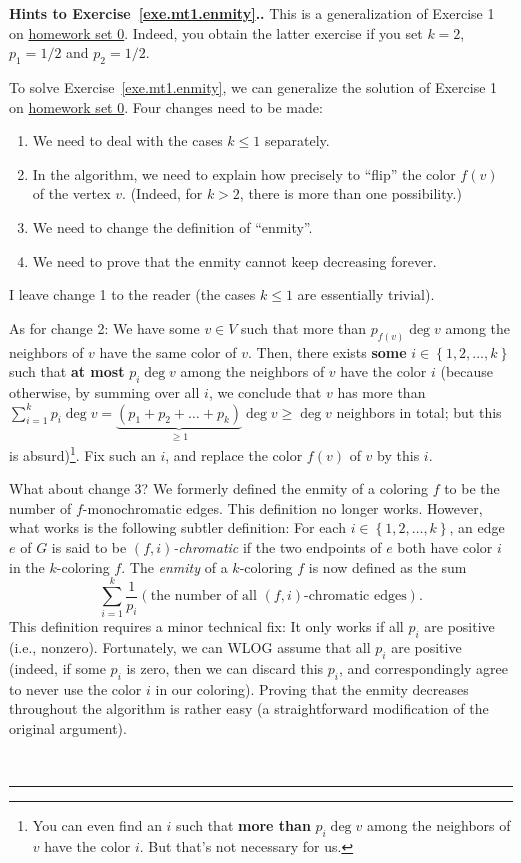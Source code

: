 \documentclass[numbers=enddot,12pt,final,onecolumn,notitlepage]{scrartcl}%
\newcounter{exer}
\theoremstyle{definition}
\newenvironment{proof}[1][Proof]{\noindent\textbf{#1.} }{\ \rule{0.5em}{0.5em}}
\let\sumnonlimits\sum
\renewcommand{\sum}{\sumnonlimits\limits}
\newcommand{\set}[1]{\left\{ #1 \right\}}
\newcommand{\tup}[1]{\left( #1 \right)}
\begin{document}
\begin{proof}[Hints to Exercise~\ref{exe.mt1.enmity}.]
This is a generalization of Exercise 1 on
\href{http://www-users.math.umn.edu/~dgrinber/5707s17/hw0s.pdf}{homework set 0}.
Indeed, you obtain the latter exercise if you set $k = 2$, $p_1 = 1/2$
and $p_2 = 1/2$.

To solve Exercise~\ref{exe.mt1.enmity}, we can generalize the solution
of Exercise 1 on
\href{http://www-users.math.umn.edu/~dgrinber/5707s17/hw0s.pdf}{homework set 0}.
Four changes need to be made:

\begin{enumerate}
\item We need to deal with the cases $k \leq 1$ separately.
\item In the algorithm, we need to explain how precisely to ``flip''
      the color $f\tup{v}$ of the vertex $v$. (Indeed, for $k > 2$,
      there is more than one possibility.)
\item We need to change the definition of ``enmity''.
\item We need to prove that the enmity cannot keep decreasing forever.
\end{enumerate}

I leave change 1 to the reader (the cases $k \leq 1$ are essentially
trivial).

As for change 2: We have some $v \in V$ such that more than
$p_{f\tup{v}} \deg v$ among the neighbors of $v$ have the same color
of $v$. Then, there exists \textbf{some} $i \in \set{1, 2, \ldots, k}$
such that \textbf{at most} $p_i \deg v$ among the neighbors of $v$
have the color $i$ (because otherwise, by summing over all $i$, we
conclude that $v$ has more than
$\sum_{i=1}^k p_i \deg v
= \underbrace{\tup{p_1+p_2+\ldots+p_k}}_{\geq 1} \deg v
\geq \deg v$ neighbors in total; but this is absurd)\footnote{You can
even find an $i$ such that \textbf{more than} $p_i \deg v$ among the
neighbors of $v$ have the color $i$. But that's not necessary for
us.}. Fix such an $i$,
and replace the color $f \tup{v}$ of $v$ by this $i$.

What about change 3? We formerly defined the enmity of a coloring $f$
to be the number of $f$-monochromatic edges. This definition no longer
works. However, what works is the following subtler definition: For
each $i \in \set{1, 2, \ldots, k}$, an edge $e$ of $G$ is said to be
\textit{$\tup{f, i}$-chromatic} if the two endpoints of $e$ both have
color $i$ in the $k$-coloring $f$. The \textit{enmity} of a
$k$-coloring $f$ is now defined as the sum
\[
\sum_{i=1}^k \dfrac{1}{p_i} \tup{ \text{the number of all }
                                  \tup{f, i}\text{-chromatic edges} }.
\]
This definition requires a minor technical fix: It only works if all
$p_i$ are positive (i.e., nonzero). Fortunately, we can WLOG assume
that all $p_i$ are positive (indeed, if some $p_i$ is zero, then
we can discard this $p_i$, and correspondingly agree to never use the
color $i$ in our coloring). Proving that the enmity decreases
throughout the algorithm is rather easy (a straightforward
modification of the original argument).


\end{proof}
\end{document}
